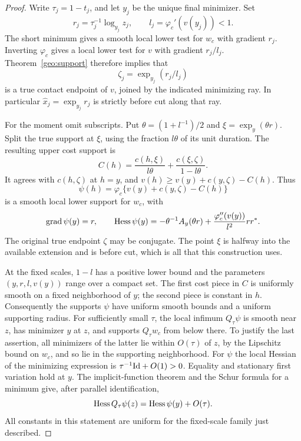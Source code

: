 \begin{proof}
Write $\tau_j=1-t_j$, and let $y_j$ be the unique final minimizer.
Set
\[
 r_j=\tau_j^{-1}\log_{y_j}z_j,\qquad
 l_j=\varphi_c'(v(y_j))<1.
\]
The short minimum gives a smooth local lower test for $w_c$ with
gradient $r_j$. Inverting $\varphi_c$ gives a local lower test for
$v$ with gradient $r_j/l_j$. Theorem~\ref{geo:support} therefore
implies that
\[
 \zeta_j=\exp_{y_j}(r_j/l_j)
\]
is a true contact endpoint of $v$, joined by the indicated minimizing
ray. In particular $\widehat x_j=\exp_{y_j}r_j$ is strictly before
cut along that ray.

For the moment omit subscripts. Put
$\theta=(1+l^{-1})/2$ and $\xi=\exp_y(\theta r)$.
Split the true support at $\xi$, using the fraction $l\theta$ of its
unit duration. The resulting upper cost support is
\[
 C(h)=\frac{c(h,\xi)}{l\theta}
       +\frac{c(\xi,\zeta)}{1-l\theta}.
\]
It agrees with $c(h,\zeta)$ at $h=y$, and $v(h)\ge
v(y)+c(y,\zeta)-C(h)$. Thus
\[
 \psi(h)=\varphi_c\{v(y)+c(y,\zeta)-C(h)\}
\]
is a smooth local lower support for $w_c$, with
\begin{equation}\label{jet:center-support-jet}
 \operatorname{grad}\psi(y)=r,\qquad
 \operatorname{Hess}\psi(y)
 =-\theta^{-1}A_y(\theta r)
   +\frac{\varphi_c''(v(y))}{l^2}rr^*.
\end{equation}
The original true endpoint $\zeta$ may be conjugate. The point $\xi$
is halfway into the available extension and is before cut, which is
all that this construction uses.

At the fixed scales, $1-l$ has a positive lower bound and the
parameters $(y,r,l,v(y))$ range over a compact set. The first cost
piece in $C$ is uniformly smooth on a fixed neighborhood of $y$;
the second piece is constant in $h$. Consequently the supports
$\psi$ have uniform smooth bounds and a uniform supporting radius.
For sufficiently small $\tau$, the local infimum $Q_\tau\psi$ is
smooth near $z$, has minimizer $y$ at $z$, and supports
$Q_\tau w_c$ from below there. To justify the last assertion, all
minimizers of the latter lie within $O(\tau)$ of $z$, by the
Lipschitz bound on $w_c$, and so lie in the supporting neighborhood.
For $\psi$ the local Hessian of the minimizing expression is
$\tau^{-1}\mathrm{Id}+O(1)>0$. Equality and stationary first variation hold
at $y$. The implicit-function theorem and the Schur formula for a
minimum give, after parallel identification,
\begin{equation}\label{jet:smooth-short-limit}
 \operatorname{Hess} Q_\tau\psi(z)=\operatorname{Hess}\psi(y)+O(\tau).
\end{equation}
All constants in this statement are uniform for the fixed-scale
family just described.


\end{proof}
